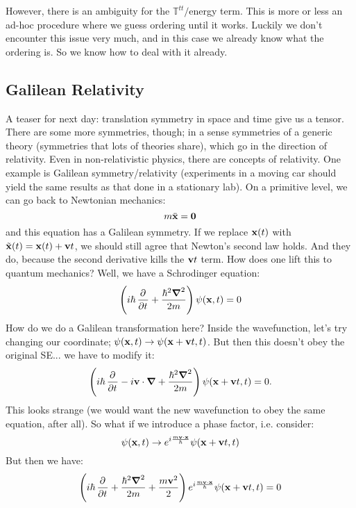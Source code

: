 However, there is an ambiguity for the $\mathbb{T}^{tt}/$energy term. This is more or less an ad-hoc procedure where we guess ordering until it works. Luckily we don't encounter this issue very much, and in this case we already know what the ordering is. So we know how to deal with it already.

\subsection{Galilean Relativity}
A teaser for next day: translation symmetry in space and time give us a tensor. There are some more symmetries, though; in a sense symmetries of a generic theory (symmetries that lots of theories share), which go in the direction of relativity. Even in non-relativistic physics, there are concepts of relativity. One example is Galilean symmetry/relativity (experiments in a moving car should yield the same results as that done in a stationary lab). On a primitive level, we can go back to Newtonian mechanics:
\begin{equation}
    m\ddot{\mathbf{x}} = \mathbf{0}
\end{equation}
and this equation has a Galilean symmetry. If we replace $\mathbf{x}(t)$ with $\tilde{\mathbf{x}}(t) = \mathbf{x}(t) + \mathbf{v}t$, we should still agree that Newton's second law holds. And they do, because the second derivative kills the $\mathbf{v}t$ term. How does one lift this to quantum mechanics? Well, we have a Schrodinger equation:
\begin{equation}
    \left(i\hbar \dpd{}{t} + \frac{\hbar^2\nabla^2}{2m}\right)\psi(\v{x}, t) = 0
\end{equation}
How do we do a Galilean transformation here?  Inside the wavefunction, let's try changing our coordinate; $\psi(\mathbf{x}, t) \to \psi(\mathbf{x} + \mathbf{v}t, t)$. But then this doesn't obey the original SE... we have to modify it:
\begin{equation}
    \left(i\hbar \dpd{}{t} - i\v{v}\cdot \nabla + \frac{\hbar^2\nabla^2}{2m}\right)\psi(\v{x} + \v{v}t, t) = 0.
\end{equation}
This looks strange (we would want the new wavefunction to obey the same equation, after all). So what if we introduce a phase factor, i.e. consider:
\begin{equation}
    \psi(\mathbf{x}, t) \to e^{i\frac{m\mathbf{v}\cdot \mathbf{x}}{\hbar}}\psi(\mathbf{x} + \mathbf{v}t, t)
\end{equation}
But then we have:
\begin{equation}
    \left(i\hbar\dpd{}{t} + \frac{\hbar^2\nabla^2}{2m} + \frac{m\v{v}^2}{2}\right)e^{i\frac{m\v{v}\cdot \v{x}}{\hbar}}\psi(\v{x} + \v{v}t, t) = 0
\end{equation}
